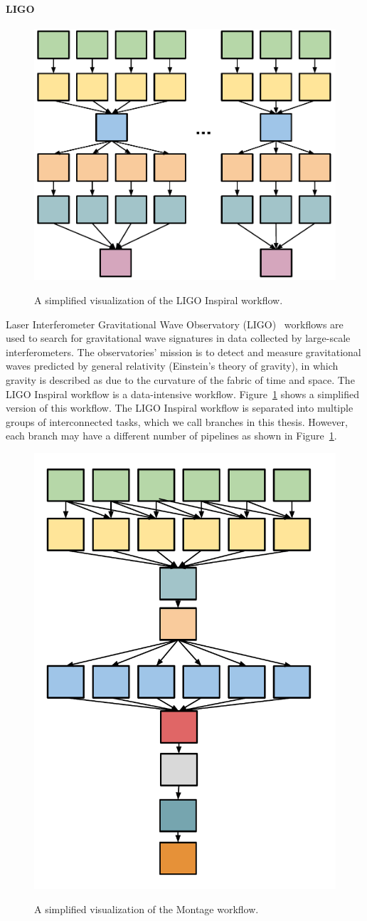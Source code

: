 \paragraph{\textbf{LIGO}}
\begin{figure}[!htb]
	\centering
	\includegraphics[width=0.45\linewidth]{figures/workflowsim/ligo_shape.pdf} \\
	\caption{A simplified visualization of the LIGO Inspiral workflow.}
	\label{fig:model_shape_ligo}
\end{figure}
Laser Interferometer Gravitational Wave Observatory (LIGO)~\cite{LIGO} workflows are used to search for gravitational wave signatures in data collected by large-scale interferometers. The observatories' mission is to detect and measure gravitational waves predicted by general relativity (Einstein's theory of gravity), in which gravity is described as due to the curvature of the fabric of time and space. The LIGO Inspiral workflow is a data-intensive workflow. Figure~\ref{fig:model_shape_ligo} shows a simplified version of this workflow. The LIGO Inspiral workflow is separated into multiple groups of interconnected tasks, which we call branches in this thesis. However, each branch may have a different number of pipelines as shown in Figure~\ref{fig:model_shape_ligo}. 

\begin{figure}[htb]
	\centering
	\includegraphics[width=0.4\linewidth]{figures/workflowsim/montage_shape.pdf} \\
	\caption{A simplified visualization of the Montage workflow.}
	\label{fig:model_shape_montage}
\end{figure}

